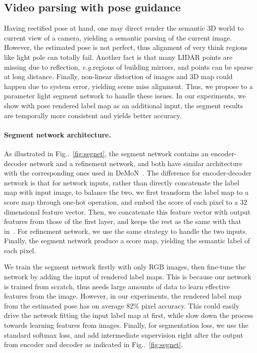 \documentclass[10pt,twocolumn,letterpaper]{article}
\makeatletter
\newcommand{\figref}[1]{Fig\onedot~\ref{#1}}
\DeclareRobustCommand\onedot{\futurelet\@let@token\@onedot}
\def\onedot{\ifx\@let@token.\else.\null\fi\xspace}
\def\eg{\emph{e.g.}}
\makeatother
\begin{document}
\subsection{Video parsing with pose guidance}
Having rectified pose at hand, one may direct render the semantic 3D world to current view of a camera, yielding a semantic parsing of the current image. However, the estimated pose is not perfect, thus alignment of very think regions like light pole can totally fail. Another fact is that many LIDAR points are missing due to reflection, \eg regions of building mirrors, and points can be sparse at long distance. Finally, non-linear distortion of images and 3D map could happen due to system error, yielding scene miss alignment. Thus, we propose to a parameter light segment network to handle these issues. 
In our experiments, we show with pose rendered label map as an additional input, the segment results are temporally more consistent and yields better accuracy.

\begin{figure*}[]
\fbox{\rule{0pt}{2in} \rule{.9\linewidth}{0pt}}
   \caption{Architecture of the segment network.}
\label{fig:segnet}
\end{figure*}
\paragraph{Segment network architecture.} As illustrated in \figref{fig:segnet}, the segment network contains an encoder-decoder network and a refinement network, and both have similar architecture with the corresponding ones used in DeMoN~\cite{ummenhofer2016demon}. 
The difference for encoder-decoder network is that for network inputs, rather than directly concatenate the label map with input image, to balance the two, we first transform the label map to a score map through one-hot operation, and embed the score of each pixel to a 32 dimensional feature vector. Then, we concatenate this feature vector with output features from those of the first layer, and keeps the rest as the same with that in~\cite{ummenhofer2016demon}. For refinement network, we use the same strategy to handle the two inputs. Finally, the segment network produce a score map, yielding the semantic label of each pixel.

We train the segment network firstly with only RGB images, then fine-tune the network by adding the input of rendered label maps. This is because our network is trained from scratch, thus needs large amounts of data to learn effective features from the image. However, in our experiments, the rendered label map from the estimated pose has on average 82$\%$ pixel accuracy. This could easily drive the network fitting the input label map at first, while slow down the process towards learning features from images. Finally, for segmentation loss, we use the standard softmax loss, and add intermediate supervision right after the output from encoder and decoder as indicated in \figref{fig:segnet}.
\end{document}
